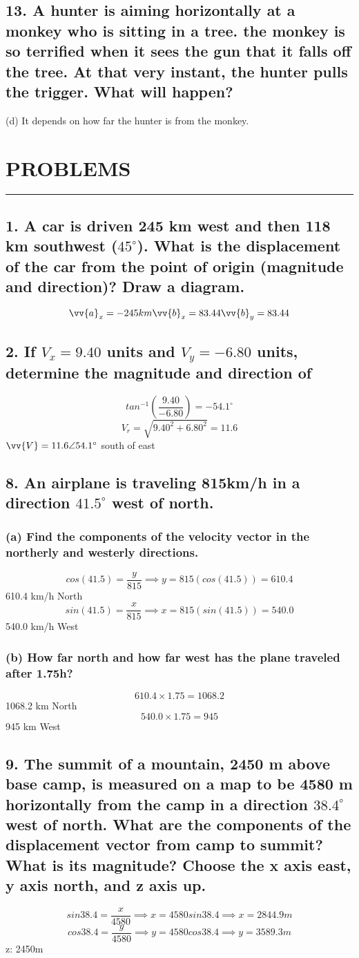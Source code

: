 \documentclass[12pt,a4paper,english]{article}
\newcommand{\degree}[1]{${#1}^\circ$}
\begin{document}
\begin{flushleft}
  \subsection{13. A hunter is aiming horizontally at a monkey who is sitting in a tree. the monkey is so terrified when it sees the gun that it falls off the tree. At that very instant, the hunter pulls the trigger. What will happen?}
  (d) It depends on how far the hunter is from the monkey.
  \pagebreak
  \section*{PROBLEMS}
  \hrule
  \subsection{1. A car is driven 245 km west and then 118 km southwest (\degree{45}). What is the displacement of the car from the point of origin (magnitude and direction)? Draw a diagram.}
  \[
  \vv{a}_x=-245km
  \vv{b}_x=83.44
  \vv{b}_y=83.44
\]
  \subsection{2. If $V_x=9.40$ units and $V_y=-6.80$ units, determine the magnitude and direction of }
  \[
    tan^{-1}(\frac{9.40}{-6.80})=-54.1^\circ
  \]
  \[
    V_r=\sqrt{9.40^2+6.80^2}=11.6
  \]
    $\vv{V}=11.6 \angle 54.1^\circ$ south of east
  \subsection{8. An airplane is traveling 815km/h in a direction \degree{41.5} west of north.}
  \subsubsection{(a) Find the components of the velocity vector in the northerly and westerly directions.}
  \[
    cos(41.5)=\frac{y}{815} \implies y=815(cos(41.5))=610.4
  \]
  610.4 km/h North
  \[
    sin(41.5)=\frac{x}{815} \implies x=815(sin(41.5)) = 540.0
  \]
  540.0 km/h West
  \subsubsection{(b) How far north and how far west has the plane traveled after 1.75h?}
  \[
    610.4\times 1.75=1068.2
  \]
1068.2 km North
\[
  540.0\times 1.75=945
\]
945 km West
  \subsection{9. The summit of a mountain, 2450 m above base camp, is measured on a map to be 4580 m horizontally from the camp in a direction \degree{38.4} west of north. What are the components of the displacement vector from camp to summit? What is its magnitude? Choose the x axis east, y axis north, and z axis up.}
  \[
    sin38.4=\frac{x}{4580}\implies
    x=4580sin38.4\implies
    x=2844.9m
  \]
  \[
    cos38.4=\frac{y}{4580}\implies
    y=4580cos38.4\implies
    y=3589.3m
  \]
  z: 2450m


\end{flushleft}
\end{document}
